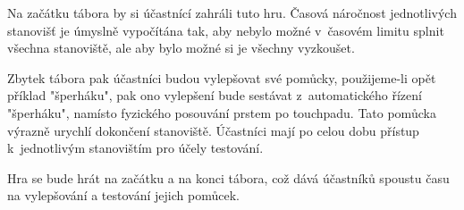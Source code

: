Na začátku tábora by si účastnící zahráli tuto hru.
Časová náročnost jednotlivých stanovišť je úmyslně vypočítána tak, aby nebylo možné v~časovém limitu splnit všechna stanoviště, ale aby bylo možné si je všechny vyzkoušet.

Zbytek tábora pak účastníci budou vylepšovat své pomůcky, použijeme-li opět příklad "šperháku", pak ono vylepšení bude sestávat z~automatického řízení "šperháku", namísto fyzického posouvání prstem po touchpadu. Tato pomůcka výrazně urychlí dokončení stanoviště.
Účastníci mají po celou dobu přístup k~jednotlivým stanovištím pro účely testování.

Hra se bude hrát na začátku a na konci tábora, což dává účastníků spoustu času na vylepšování a testování jejich pomůcek.
